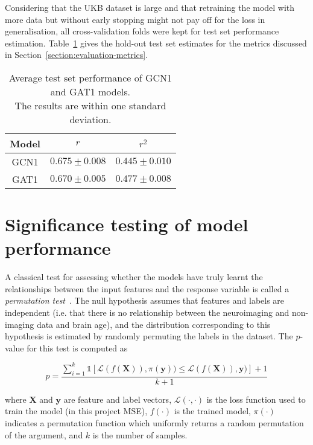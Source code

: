 Considering that the UKB dataset is large and that retraining the model with more data but without early stopping might not pay off for the loss in generalisation, all cross-validation folds were kept for test set performance estimation. Table~\ref{table:test-performance} gives the hold-out test set estimates for the metrics discussed in Section~\ref{section:evaluation-metrics}.

\begin{table}[h]
    \caption{Average test set performance of GCN1 and GAT1 models. \\ The results are within one standard deviation.}\label{table:test-performance}
    \centering
    \small
    \begin{tabular}{ccc}
        \hline
    \textbf{Model} & $r$ & $r^2$ \\  \hline
        GCN1 & $0.675 \pm 0.008$ & $0.445 \pm 0.010$ \\
        GAT1 & $0.670 \pm 0.005$ & $0.477 \pm 0.008$ \\ \hline
\end{tabular}
\end{table}


\section{Significance testing of model performance}
A classical test for assessing whether the models have truly learnt the relationships between the input features and the response variable is called a \textit{permutation test}~\cite{ojala2010permutation}. The null hypothesis assumes that features and labels are independent (i.e. that there is no relationship between the neuroimaging and non-imaging data and brain age), and the distribution corresponding to this hypothesis is estimated by randomly permuting the labels in the dataset. The $p$-value for this test is computed as

\begin{equation}
    p = \frac{\sum_{i=1}^k \mathbb{1}\left[\mathcal{L}(f(\mathbf{X})), \pi(\mathbf{y})) \leq \mathcal{L}(f(\mathbf{X})), \mathbf{y})\right] + 1}{k+1}\label{eq:p-value}
\end{equation}

where $\mathbf{X}$ and $\mathbf{y}$ are feature and label vectors, $\mathcal{L}(\cdot, \cdot)$ is the loss function used to train the model (in this project MSE), $f(\cdot)$ is the trained model, $\pi(\cdot)$ indicates a permutation function which uniformly returns a random permutation of the argument, and $k$ is the number of samples.

